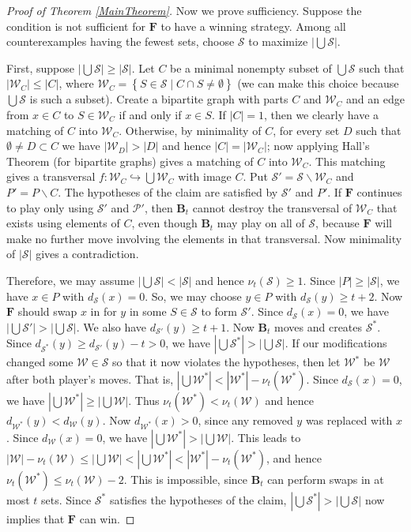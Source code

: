 \documentclass[12pt]{amsart}
\theoremstyle{plain}
\theoremstyle{definition}
\theoremstyle{remark}
\newcommand{\fancy}[1]{\mathcal{#1}}
\newcommand{\inj}{\hookrightarrow}
\newcommand{\setb}[3]{\left\{ #1 \in #2 \mid #3 \right\}}
\newcommand{\card}[1]{\left|#1\right|}
\newcommand{\funcinj}[3]{#1\colon #2 \inj #3}
\renewcommand{\S}{\fancy{S}}
\newcommand{\W}{\fancy{W}}
\renewcommand{\P}{\fancy{P}}
\newcommand{\F}{\mathbf{F}}
\newcommand{\B}{\mathbf{B}}
\newcommand{\myhat}[1]{#1^*}
\begin{document}
\begin{proof}[Proof of Theorem \ref{MainTheorem}]
Now we prove sufficiency.  Suppose the condition is not sufficient for $\F$ to
have a winning strategy.  Among all counterexamples having the fewest sets, choose $\S$ to maximize $\card{\bigcup \S}$.

First, suppose $\card{\bigcup \S} \geq \card{\S}$.
Let $C$ be a minimal nonempty subset of $\bigcup \S$ such that $\card{\W_C} \le
\card{C}$, where $\W_C = \setb{S}{\S}{C \cap S \neq \emptyset}$ (we
can make this choice because $\bigcup \S$ is such a subset).  Create a bipartite graph
with parts $C$ and $\W_C$ and an edge from $x \in C$ to $S \in \W_C$ if and only if $x \in
S$. If $\card{C} = 1$, then we clearly have a matching of $C$ into $\W_C$.  Otherwise,
by minimality of $C$, for every set $D$ such that $\emptyset \neq D \subset C$ we have
$\card{\W_D} > \card{D}$ and hence $\card{C} = \card{\W_C}$; now applying Hall's
Theorem (for bipartite graphs) gives a matching of $C$ into $\W_C$.  This matching gives
a transversal $\funcinj{f}{\W_C}{\bigcup \W_C}$ with image $C$.  Put $\S' = \S \smallsetminus \W_C$ and $P' = P \smallsetminus C$. The hypotheses of the claim are satisfied by $\S'$ and $P'$.  If $\F$ continues to play only using $\S'$ and $\P'$, then $\B_t$ cannot destroy the transversal of $\W_C$ that exists using elements of $C$, 
even though $\B_t$ may play on all of $\S$, because $\F$ will make no further move involving the elements in that transversal. 
Now minimality of $\card{\S}$ gives a contradiction.

Therefore, we may assume $\card{\bigcup \S} < \card{\S}$ and hence $\nu_t(\S) \ge
1$.  Since $\card{P} \geq \card{\S}$, we have $x \in P$ with $d_{\S}(x) = 0$.  So, we may choose $y \in P$
with $d_{\S}(y) \geq t + 2$. Now $\F$ should swap $x$ in for $y$ in some $S \in
\S$ to form $\S'$.  Since $d_{\S}(x) = 0$, we have $\card{\bigcup \S'} >
\card{\bigcup \S}$.  We also have $d_{\S'}(y) \geq t + 1$.  Now $\B_t$ moves
and creates $\myhat{\S}$. Since $d_{\myhat{\S}}(y) \geq d_{\S'}(y) - t > 0$, we have 
$\card{\bigcup \myhat{\S}} > \card{\bigcup \S}$.  If our modifications changed
some $\W \in \S$ so that it now violates the hypotheses, then let $\myhat{\W}$ be $\W$
after both player's moves.  That is, $\card{\bigcup \myhat{\W}} < \card{\myhat{\W}} - \nu_t(\myhat{\W})$. 
Since $d_{\S}(x) = 0$, we have $\card{\bigcup \myhat{\W}} \geq \card{\bigcup \W}$.  Thus
$\nu_t(\myhat{\W}) < \nu_t(\W)$ and hence $d_{\myhat{\W}}(y) < d_{\W}(y)$.  Now
$d_{\myhat{\W}}(x) > 0$, since any removed $y$ was replaced with $x$. Since $d_{\W}(x) = 0$, we have $\card{\bigcup \myhat{\W}} > \card{\bigcup \W}$.
This leads to $\card{\W} - \nu_t(\W) \le \card{\bigcup \W} < \card{\bigcup \myhat{\W}} < \card{\myhat{\W}} - \nu_t(\myhat{\W})$, and hence $\nu_t(\myhat{\W}) \le \nu_t(\W) - 2$. This is impossible,
since $\B_t$ can perform swaps in at most $t$ sets.
Since $\myhat{\S}$ satisfies the hypotheses of the claim, $\card{\bigcup \myhat{\S}} >
\card{\bigcup \S}$ now implies that $\F$ can win.
\end{proof}
\end{document}
